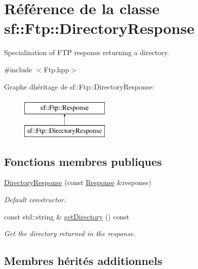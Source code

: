 \hypertarget{classsf_1_1Ftp_1_1DirectoryResponse}{}\section{Référence de la classe sf\+:\+:Ftp\+:\+:Directory\+Response}
\label{classsf_1_1Ftp_1_1DirectoryResponse}


Specialization of F\+TP response returning a directory.  




{\ttfamily \#include $<$Ftp.\+hpp$>$}

Graphe d\textquotesingle{}héritage de sf\+:\+:Ftp\+:\+:Directory\+Response\+:\begin{figure}[H]
\begin{center}
\leavevmode
\includegraphics[height=2.000000cm]{classsf_1_1Ftp_1_1DirectoryResponse}
\end{center}
\end{figure}
\subsection*{Fonctions membres publiques}
\begin{DoxyCompactItemize}
\item 
\hyperlink{classsf_1_1Ftp_1_1DirectoryResponse_a36b6d2728fa53c4ad37b7a6307f4d388}{Directory\+Response} (const \hyperlink{classsf_1_1Ftp_1_1Response}{Response} \&response)
\begin{DoxyCompactList}\small\item\em Default constructor. \end{DoxyCompactList}\item 
const std\+::string \& \hyperlink{classsf_1_1Ftp_1_1DirectoryResponse_a311575c5c50905219025acfa73de67e2}{get\+Directory} () const
\begin{DoxyCompactList}\small\item\em Get the directory returned in the response. \end{DoxyCompactList}\end{DoxyCompactItemize}
\subsection*{Membres hérités additionnels}


